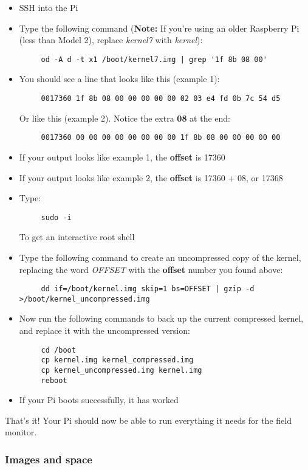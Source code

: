 \documentclass[10pt]{article}
\begin{document}
\begin{itemize}
 \item SSH into the Pi
 \item Type the following command (\textbf{Note:} If you're using an older Raspberry Pi (less than Model 2), replace \textit{kernel7} with \textit{kernel}):
	\begin{verbatim}
	 od -A d -t x1 /boot/kernel7.img | grep '1f 8b 08 00'
	\end{verbatim}
  \item You should see a line that looks like this (example 1):
	\begin{verbatim}
	 0017360 1f 8b 08 00 00 00 00 00 02 03 e4 fd 0b 7c 54 d5
	\end{verbatim}
	Or like this (example 2). Notice the extra \textbf{08} at the end:
	\begin{verbatim}
	 0017360 00 00 00 00 00 00 00 00 1f 8b 08 00 00 00 00 00
	\end{verbatim}
  \item If your output looks like example 1, the \textbf{offset} is 17360
  \item If your output looks like example 2, the \textbf{offset} is 17360 + 08, or 17368
  \item Type:
	\begin{verbatim}
	 sudo -i
	\end{verbatim}
	To get an interactive root shell
  \item Type the following command to create an uncompressed copy of the kernel, replacing the word \textit{OFFSET} with the \textbf{offset} number
	you found above:
	\begin{verbatim}
	 dd if=/boot/kernel.img skip=1 bs=OFFSET | gzip -d >/boot/kernel_uncompressed.img
	\end{verbatim}
  \item Now run the following commands to back up the current compressed kernel, and replace it with the uncompressed version:
	\begin{verbatim}
	 cd /boot
	 cp kernel.img kernel_compressed.img
	 cp kernel_uncompressed.img kernel.img
	 reboot
	\end{verbatim}
  \item If your Pi boots successfully, it has worked
\end{itemize}

That's it! Your Pi should now be able to run everything it needs for the field monitor.

\subsubsection{Images and space}
\end{document}
